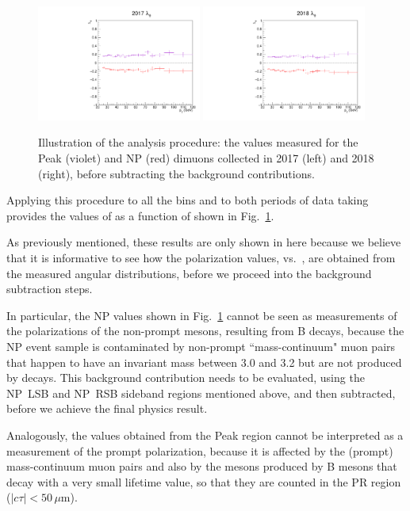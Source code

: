 \begin{figure}[t]
\centering
\includegraphics[width=0.48\textwidth]{Figures/chapter3/lth2_17.pdf}
\includegraphics[width=0.48\textwidth]{Figures/chapter3/lth2_18.pdf}
\caption{Illustration of the analysis procedure: 
the \lth values measured for the Peak (violet) and NP (red) dimuons 
collected in 2017 (left) and 2018 (right), 
before subtracting the background contributions.}
\label{fig:Peak-NP-lth}
\end{figure}

Applying this procedure to all the \pt bins and to both periods of data taking 
provides the values of \lth as a function of \pt shown in Fig.~\ref{fig:Peak-NP-lth}.

As previously mentioned, 
these results are only shown in here because we believe that it is informative
to see how the polarization values, vs.\ \pt, 
are obtained from the measured angular distributions,
before we proceed into the background subtraction steps.

In particular, the NP \lth values shown in Fig.~\ref{fig:Peak-NP-lth} 
cannot be seen as measurements of the polarizations of the non-prompt \jpsi mesons, 
resulting from B decays, because the NP event sample is contaminated by
non-prompt ``mass-continuum" muon pairs 
that happen to have an invariant mass between 3.0 and 3.2\GeV
but are not produced by \jpsi decays.
This background contribution needs to be evaluated, 
using the NP~LSB and NP~RSB sideband regions mentioned above, 
and then subtracted, before we achieve the final physics result.

Analogously, the \lth values obtained from the Peak region cannot be interpreted 
as a measurement of the prompt \jpsi polarization, because it is affected by the 
(prompt) mass-continuum muon pairs and also by the \jpsi mesons produced by B mesons
that decay with a very small lifetime value, so that they are counted in the PR region
($|c\tau| < 50\,\mu$m).

